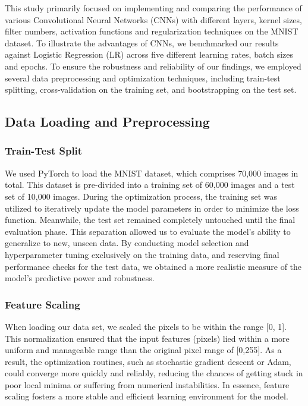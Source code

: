 This study primarily focused on implementing and comparing the performance of various Convolutional Neural Networks (CNNs) with different layers, kernel sizes, filter numbers, activation functions and regularization techniques on the MNIST dataset. To illustrate the advantages of CNNs, we benchmarked our results against Logistic Regression (LR) across five different learning rates, batch sizes and epochs. To ensure the robustness and reliability of our findings, we employed several data preprocessing and optimization techniques, including train-test splitting, cross-validation on the training set, and bootstrapping on the test set.                


\subsection{Data Loading and Preprocessing}

\subsubsection{Train-Test Split}

We used PyTorch to load the MNIST dataset, which comprises 70,000 images in total. This dataset is pre-divided into a training set of 60,000 images and a test set of 10,000 images. During the optimization process, the training set was utilized to iteratively update the model parameters in order to minimize the loss function. Meanwhile, the test set remained completely untouched until the final evaluation phase. This separation allowed us to evaluate the model's ability to generalize to new, unseen data. By conducting model selection and hyperparameter tuning exclusively on the training data, and reserving final performance checks for the test data, we obtained a more realistic measure of the model’s predictive power and robustness.

\subsubsection{Feature Scaling}
When loading our data set, we scaled the pixels to be within the range [0, 1]. This normalization ensured that the input features (pixels) lied within a more uniform and manageable range than the original pixel range of [0,255]. As a result, the optimization routines, such as stochastic gradient descent or Adam, could converge more quickly and reliably, reducing the chances of getting stuck in poor local minima or suffering from numerical instabilities. In essence, feature scaling fosters a more stable and efficient learning environment for the model. 

